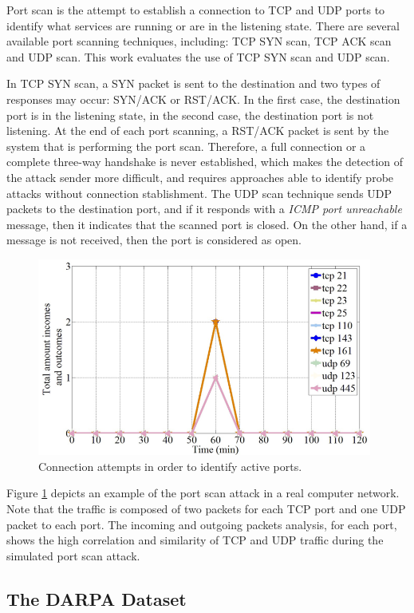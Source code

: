 Port scan is the attempt to establish a connection to TCP and UDP ports to identify what services are running or are in the listening state. There are several available port scanning techniques, including: TCP SYN scan, TCP ACK scan and UDP scan. This work evaluates the use of TCP SYN scan and UDP scan. 

In TCP SYN scan, a SYN packet is sent to the destination and two types of responses may occur: SYN/ACK or RST/ACK. In the first case, the destination port is in the listening state, in the second case, the destination port is not listening. At the end of each port scanning, a RST/ACK packet is sent by the system that is performing the port scan. Therefore, a full connection or a complete three-way handshake is never established, which makes the detection of the attack sender more difficult, and requires approaches able to identify probe attacks without connection stablishment. The UDP scan technique sends UDP packets to the destination port, and if it responds with a \emph{ICMP port unreachable} message, then it indicates that the scanned port is closed. On the other hand, if a message is not received, then the port is considered as open.

\begin{figure}[h!]
     \centering 
     \includegraphics[width=11cm]{figures/fig07.png}
     \caption{Connection attempts in order to identify active ports.}
     \label{fig:2_fig7}
\end{figure}

Figure \ref{fig:2_fig7} depicts an example of the port scan attack in a real computer network. Note that the traffic is composed of two packets for each TCP port and one UDP packet to each port. The incoming and outgoing packets analysis, for each port, shows the high correlation and similarity of TCP and UDP traffic during the simulated port scan attack.

\subsection{The DARPA Dataset}
\label{sec:2_DarpaDataset}

